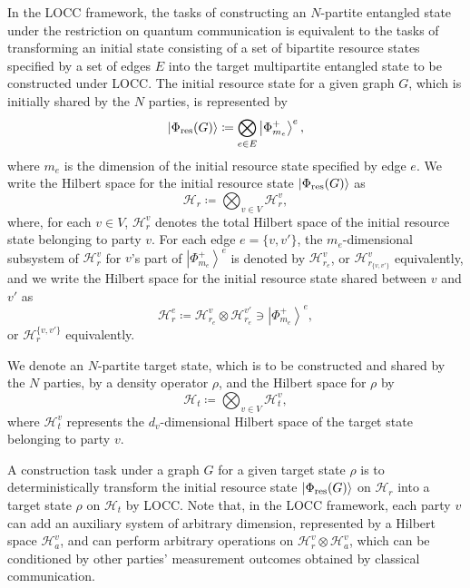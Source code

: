 \documentclass[preprintnumbers,aps,amsmath,amssymb,pra,twocolumn,showpacs,superscriptaddress,floatfix]{revtex4-1}
\def\Ket#1{\left|#1\right\rangle}
\theoremstyle{plain}
\theoremstyle{definition}
\theoremstyle{remark}
\begin{document}
In the LOCC framework, the tasks of constructing an $N$-partite entangled state under the restriction on quantum communication is equivalent to the tasks of transforming an initial state consisting of a set of bipartite resource states specified by a set of edges $E$ into the target multipartite entangled state to be constructed under LOCC\@.    The initial resource state for a given graph $G$, which is initially shared by the $N$ parties, is represented by 
\begin{align*}
\Ket{\Phi_{\textup{res}} (G)} \coloneqq \bigotimes_{e\in E}\Ket{\Phi_{m_e}^+}^e,
\end{align*} 
where $m_e$ is the dimension of the initial resource state specified by edge $e$.
We write the Hilbert space for the initial resource state $\Ket{\Phi_{\textup{res}} (G)}$ as 
\[
  \mathcal{H}_r \coloneqq \bigotimes_{v\in V}\mathcal{H}_{r}^v,
\]
where, for each $v\in V$, $\mathcal{H}_{r}^v$ denotes the total Hilbert space of the initial resource state belonging to party $v$.
For each edge $e=\{v,v'\}$, the $m_e$-dimensional subsystem of $\mathcal{H}_{r}^v$ for $v$'s part of $\Ket{\Phi_{m_e}^+}^e$ is denoted by $\mathcal{H}_{r_{e}}^v$, or $\mathcal{H}_{r_{\{v,v'\}}}^v$ equivalently, and we write the Hilbert space for the initial resource state shared between $v$ and $v'$ as	
\[
  \mathcal{H}_r^e \coloneqq \mathcal{H}^{v}_{r_e}\otimes\mathcal{H}^{v'}_{r_e} \ni \Ket{\Phi_{m_e}^+}^e,
\]
or $\mathcal{H}_r^{\{v,v'\}}$ equivalently.

We denote an $N$-partite target state, which is to be constructed and shared by the $N$ parties, by a density operator $\rho$, and the Hilbert space for $\rho$ by
\[
  \mathcal{H}_t \coloneqq \bigotimes_{v\in V} \mathcal{H}_t^v,
\]
where $\mathcal{H}_t^v$ represents the $d_v$-dimensional Hilbert space of the target state belonging to party $v$.

A construction task under a graph $G$ for a given target state $\rho$ is to deterministically transform the initial resource state $\Ket{\Phi_{\textup{res}} (G)}$ on $\mathcal{H}_r$ into a target state $\rho$ on $\mathcal{H}_t$ by LOCC\@.
Note that, in the LOCC framework, each party $v$ can add an auxiliary system of arbitrary dimension, represented by a Hilbert space $\mathcal{H}^v_a$, and can perform arbitrary operations on $\mathcal{H}_r^v \otimes \mathcal{H}_a^v$, which can be conditioned by other parties' measurement outcomes obtained by classical communication.
\end{document}
